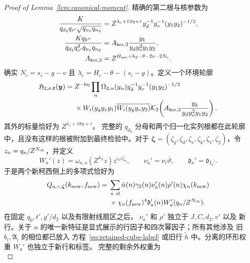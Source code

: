 \documentclass[11pt,a4paper]{article}
\numberwithin{equation}{section}
\numberwithin{figure}{section}
\theoremstyle{definition}
\theoremstyle{remark}
\begin{document}
\begin{proof}[Proof of Lemma~\ref{lem:canonical-moment}]
精确的第二根与核参数为
\begin{equation}\label{eq:inverse-second-root-kernel}
 \begin{split}
 \frac{K}{q_{d_2}q_{v'}\sqrt{q_{n_1}q_{n_2}}}
 &=Z^{\lambda_c+12\eta+\tau}y_d^{-1}y_v^{-1}(y_1y_2)^{-1/2},\\
 \frac{Kq_{k''}}{q_{d_2}q_{v'}^2q_{n_1}q_{n_2}}
 &=A_{{\rm ker},2}\frac{y_k}{y_dy_v^2y_1y_2},\\
 A_{{\rm ker},2}&=Z^{H_{\rm use}+h_2-\theta-2v-2N_c}.
 \end{split}
\end{equation}
确实 \(N_c=s_i-g-v\) 且
\(\lambda_c=H_c-\theta-(s_i-g)\)。定义一个环境轮廓
\begin{equation}\label{eq:inverse-second-profile}
 \begin{split}
 \mathfrak H_{2,\sigma,\boldsymbol t}(\boldsymbol y)={}&Z^{-6\eta}
 \prod_\alpha\Omega_{2,\alpha}(y_\alpha)
 y_d^{-1}y_v^{-1}(y_1y_2)^{-1/2}\\
 &\times W_i(y_gy_vy_1)\overline{W_i(y_gy_vy_2)}
 \mathcal K_2\!\left(A_{{\rm ker},2}\frac{y_k}{y_dy_v^2y_1y_2}\right).
 \end{split}
\end{equation}
其外的标量恰好为 \(Z^{\lambda_c+18\eta+\tau}\)。
完整的 \(q_{d_2}\) 分母和两个归一化实列根都在此轮廓中，且没有这样的根被附加到最终检验中。对于 \(\boldsymbol\zeta=(\zeta_g,\zeta_d,\zeta_v,\zeta_k,
\zeta_1,\zeta_2)\)，令 \(z_n=q_n/Z^{N_{\rm ch}}\)，并定义
\[
 W_a'(z)=\omega_{n,a}(Z^{\delta_N}z)z^{\varepsilon_a i\zeta_a},
 \qquad \nu_a'=\nu_i\overline\vartheta,\qquad
 \mathfrak d_a'=\mathfrak d_{I_a'}.
\]
于是两个新柯西侧上的多项式恰好为
\begin{equation}\label{eq:canonical-child-polynomial}
 \begin{split}
 Q_{a,\gamma,\boldsymbol\zeta}(k_{\rm new},f_{\rm new})={}&
 \sum_{n\ {\rm sf}}\bar\alpha(n)\gamma_2(n)\nu_a'(n)\rho'(n)
 \chi_n(k_{\rm new})\\
 &\times\chi_n(f_{\rm new})^4
 \mathfrak d_a'(n)W_a'(q_n/Z^{N_{\rm ch}}).
 \end{split}
\end{equation}
在固定 \(q_0,t',g'/d_2\) 以及有限射线扇区之后，
\(\nu_a'\) 和 \(\rho'\) 独立于 \(J,C,d_2,v'\) 以及
新行。关于 \(n\) 的唯一新特征是显式展示的行因子和四次幂因子；所有其他涉及
旧 \(b_i,\mathfrak A_i\) 的相位都已放入
方程~\eqref{eq:retained-cube-label} 或旧行
\(\widetilde h\) 中。分离的环形权重 \(W_a'\) 也独立于新行和标签。
完整的剩余外权重为
\begin{equation}\label{eq:inverse-second-outer-weight}

\end{equation}
\end{proof}
\end{document}
